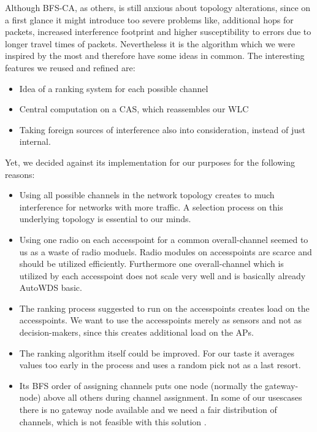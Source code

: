     Although \ac{BFS-CA}, as others, is still anxious about topology alterations, since on a first glance it might introduce too severe problems like, 
    additional hops for packets, increased interference footprint and higher susceptibility to errors due to longer travel times of packets.
    Nevertheless it is the algorithm which we were inspired by the most and therefore have some ideas in common.
    The interesting features we reused and refined are:
    
    \begin{itemize}
     \item Idea of a ranking system for each possible channel
     
     \item Central computation on a \ac{CAS}, which reassembles our \ac{WLC}
     
     \item Taking foreign sources of interference also into consideration, instead of just internal.
     
    \end{itemize}
    
    Yet, we decided against its implementation for our purposes for the following reasons:
    
    \begin{itemize}
      \item Using all possible channels in the network topology creates to much interference for networks with more traffic.
	A selection process on this underlying topology is essential to our minds.
	
      \item Using one radio on each accesspoint for a common overall-channel seemed to us as a waste of radio moduels.
	Radio modules on accesspoints are scarce and should be utilized efficiently. 
	Furthermore one overall-channel which is utilized by each accesspoint 
	does not scale very well and is basically already AutoWDS basic.
	
      \item The ranking process suggested to run on the accesspoints creates load on the accesspoints.
	We want to use the accesspoints merely as sensors and not as decision-makers, since this creates additional load on the APs.
	
      \item The ranking algorithm itself could be improved. 
	For our taste it averages values too early in the process and uses a random pick not as a last resort.
	
      \item Its \ac{BFS} order of assigning channels puts one node (normally the gateway-node) above all others during channel assignment.
	In some of our usescases there is no gateway node available and we need a fair distribution of channels, which is not feasible with this solution \cite{overview_caa}.
    \end{itemize}

